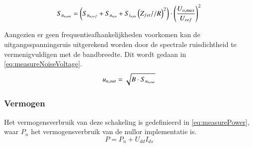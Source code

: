 \begin{equation}\label{eq:measureNoiseFull}
    S_{u_{{n,out}}} = \left(S_{u_{{n,ref}}} + S_{u_{{n,n}}} + S_{i_{{n,in}}}\left(Z_{fet} // R\right)^2\right) \cdot \left(\frac{U_{o,max}}{U_{ref}}\right)^2
    \tagaddtext{[\si{\volt\squared\per\hertz}]}
\end{equation}

Aangezien er geen frequentieafhankelijkheden voorkomen kan de uitgangsspanningsruis uitgerekend worden door de spectrale ruisdichtheid te vermenigvuldigen met de bandbreedte. Dit wordt gedaan in \cref{eq:measureNoiseVoltage}.
\begin{equation}\label{eq:measureNoiseVoltage}
    u_{n,out} = \sqrt{B \cdot S_{u_{{n,out}}}}
    \tagaddtext{[\si{\volt}]}
\end{equation}

\subsubsection{Vermogen}
Het vermogensverbruik van deze schakeling is gedefinieerd in \cref{eq:measurePower}, waar $P_n$ het vermogensverbruik van de nullor implementatie is.
\begin{equation}\label{eq:measurePower}
    P = P_n + U_{dd}I_{ds}
\end{equation}


